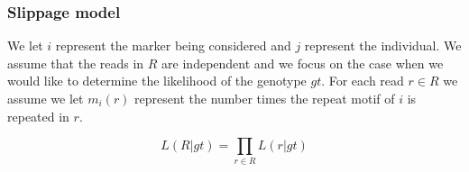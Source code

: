 \documentclass{bioinfo}
\begin{document}
\begin{methods}
\subsubsection{Slippage model}
\label{subsubsec:modelSlipp}
We let $i$ represent the marker being considered and $j$ represent the individual.
We assume that the reads in $R$ are independent and we focus on the case when we would like to determine the likelihood of the genotype $gt$.  
For each read $r\in R$ we assume we let $m_i(r)$ represent the number times the repeat motif of $i$ is repeated in $r$.

\begin{equation}
L(R|gt) = \prod_{r\in R} L(r|gt)
\end{equation}


\end{methods}
\end{document}

